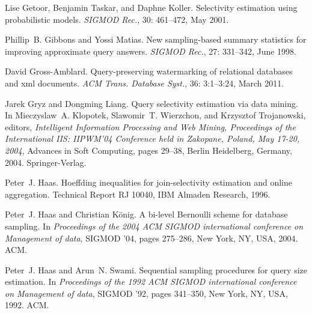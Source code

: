 \begin{thebibliography}{67}
Lise Getoor, Benjamin Taskar, and Daphne Koller.
\newblock Selectivity estimation using probabilistic models.
\newblock \emph{SIGMOD Rec.}, 30: 461--472, May 2001.

Phillip~B. Gibbons and Yossi Matias.
\newblock New sampling-based summary statistics for improving approximate query
  answers.
\newblock \emph{SIGMOD Rec.}, 27: 331--342, June 1998.

David Gross-Amblard.
\newblock Query-preserving watermarking of relational databases and xml
  documents.
\newblock \emph{ACM Trans. Database Syst.}, 36: 3:1--3:24, March 2011.

Jarek Gryz and Dongming Liang.
\newblock Query selectivity estimation via data mining.
\newblock In Mieczyslaw~A. Klopotek, Slawomir~T. Wierzchon, and Krzysztof
  Trojanowski, editors, \emph{Intelligent Information Processing and Web
  Mining, Proceedings of the International IIS: IIPWM'04 Conference held in
  Zakopane, Poland, May 17-20, 2004}, Advances in Soft Computing, pages 29--38,
  Berlin Heidelberg, Germany, 2004. Springer-Verlag.

Peter~J. Haas.
\newblock Hoeffding inequalities for join-selectivity estimation and online
  aggregation.
\newblock Technical Report RJ 10040, IBM Almaden Research, 1996.

Peter~J. Haas and Christian K\"{o}nig.
\newblock A bi-level Bernoulli scheme for database sampling.
\newblock In \emph{Proceedings of the 2004 ACM SIGMOD international conference
  on Management of data}, SIGMOD '04, pages 275--286, New York, NY, USA, 2004.
  ACM.

Peter~J. Haas and Arun~N. Swami.
\newblock Sequential sampling procedures for query size estimation.
\newblock In \emph{Proceedings of the 1992 ACM SIGMOD international conference
  on Management of data}, SIGMOD '92, pages 341--350, New York, NY, USA, 1992.
  ACM.


\end{thebibliography}
